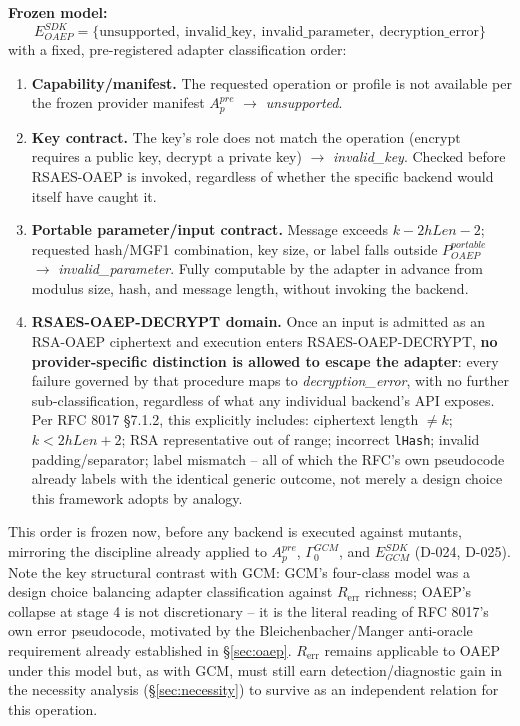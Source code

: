 \documentclass[11pt,a4paper]{article}
\begin{document}
\textbf{Frozen model:}
\[E_{OAEP}^{SDK} = \{\text{unsupported},\ \text{invalid\_key},\ \text{invalid\_parameter},\ \text{decryption\_error}\}\]
with a fixed, pre-registered adapter classification order:
\begin{enumerate}
\item \textbf{Capability/manifest.} The requested operation or profile is not available per the frozen provider manifest $A_p^{pre}$ $\to$ \emph{unsupported}.
\item \textbf{Key contract.} The key's role does not match the operation ($\text{encrypt}$ requires a public key, $\text{decrypt}$ a private key) $\to$ \emph{invalid\_key}. Checked before RSAES-OAEP is invoked, regardless of whether the specific backend would itself have caught it.
\item \textbf{Portable parameter/input contract.} Message exceeds $k - 2hLen - 2$; requested hash/MGF1 combination, key size, or label falls outside $P_{OAEP}^{portable}$ $\to$ \emph{invalid\_parameter}. Fully computable by the adapter in advance from modulus size, hash, and message length, without invoking the backend.
\item \textbf{RSAES-OAEP-DECRYPT domain.} Once an input is admitted as an RSA-OAEP ciphertext and execution enters RSAES-OAEP-DECRYPT, \textbf{no provider-specific distinction is allowed to escape the adapter}: every failure governed by that procedure maps to \emph{decryption\_error}, with no further sub-classification, regardless of what any individual backend's API exposes. Per RFC 8017 \S7.1.2, this explicitly includes: ciphertext length $\neq k$; $k < 2hLen+2$; RSA representative out of range; incorrect \texttt{lHash}; invalid padding/separator; label mismatch -- all of which the RFC's own pseudocode already labels with the identical generic outcome, not merely a design choice this framework adopts by analogy.
\end{enumerate}
This order is frozen now, before any backend is executed against mutants, mirroring the discipline already applied to $A_p^{pre}$, $\Gamma_0^{GCM}$, and $E_{GCM}^{SDK}$ (D-024, D-025). Note the key structural contrast with GCM: GCM's four-class model was a design choice balancing adapter classification against $R_{\text{err}}$ richness; OAEP's collapse at stage 4 is not discretionary -- it is the literal reading of RFC 8017's own error pseudocode, motivated by the Bleichenbacher/Manger anti-oracle requirement already established in \S\ref{sec:oaep}. $R_{\text{err}}$ remains applicable to OAEP under this model but, as with GCM, must still earn detection/diagnostic gain in the necessity analysis (\S\ref{sec:necessity}) to survive as an independent relation for this operation.
\end{document}
